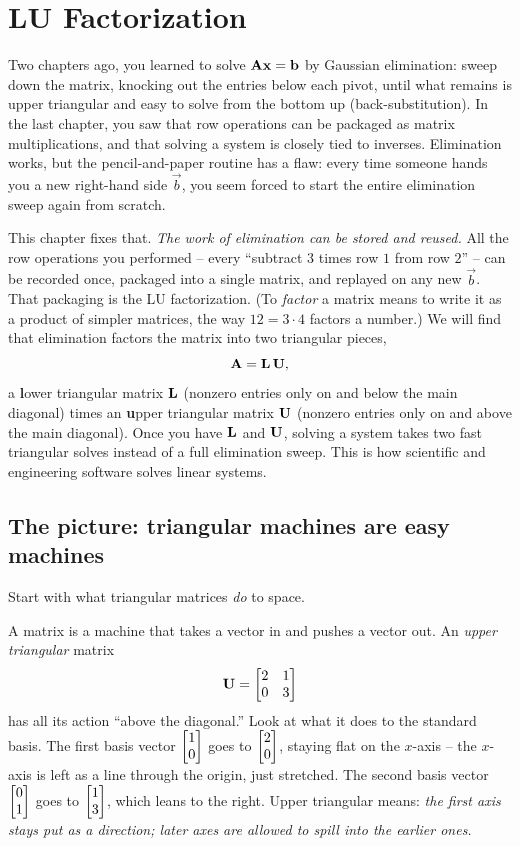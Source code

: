 \chapter{LU Factorization}

Two chapters ago, you learned to solve $\mathbf{A}\mathbf{x} = \mathbf{b}$ by Gaussian elimination:
sweep down the matrix, knocking out the entries below each pivot, until what remains is
upper triangular and easy to solve from the bottom up (back-substitution). In the last
chapter, you saw that row operations can be packaged as matrix multiplications, and that
solving a system is closely tied to inverses.
Elimination works, but the pencil-and-paper routine has a flaw: every time someone hands you
a new right-hand side $\vec{b}$, you seem forced to start the entire elimination sweep again
from scratch.

This chapter fixes that. \emph{The work of elimination can be stored and reused.} All the row
operations you performed -- every ``subtract $3$ times row $1$ from row $2$'' -- can be
recorded once, packaged into a single matrix, and replayed on any new $\vec{b}$.
That packaging is the LU factorization. (To \emph{factor} a matrix means to write it as a
product of simpler matrices, the way $12 = 3\cdot 4$ factors a number.) We will find that
elimination factors the matrix into two triangular pieces,
\[
  \mathbf{A} = \mathbf{L}\,\mathbf{U},
\]
a \textbf{l}ower triangular matrix $\mathbf{L}$ (nonzero entries only on and below the main
diagonal) times an \textbf{u}pper triangular matrix $\mathbf{U}$ (nonzero entries only on and
above the main diagonal). Once you have $\mathbf{L}$ and $\mathbf{U}$, solving a system takes two fast triangular solves instead
of a full elimination sweep. This is how scientific and engineering software solves linear
systems.

\section{The picture: triangular machines are easy machines}
\label{ch09:triangular-picture}

Start with what triangular matrices \emph{do} to space.

A matrix is a machine that takes a vector in and pushes a vector out. An \emph{upper
triangular} matrix
\[
  \mathbf{U} = \begin{bmatrix} 2 & 1 \\ 0 & 3 \end{bmatrix}
\]
has all its action ``above the diagonal.'' Look at what it does to the standard basis. The
first basis vector $\begin{bmatrix}1\\0\end{bmatrix}$ goes to $\begin{bmatrix}2\\0\end{bmatrix}$, staying flat on the
$x$-axis -- the $x$-axis is left as a line through the origin, just stretched. The second
basis vector $\begin{bmatrix}0\\1\end{bmatrix}$ goes to $\begin{bmatrix}1\\3\end{bmatrix}$, which leans to the right. Upper
triangular means: \emph{the first axis stays put as a direction; later axes are allowed to
spill into the earlier ones.}

